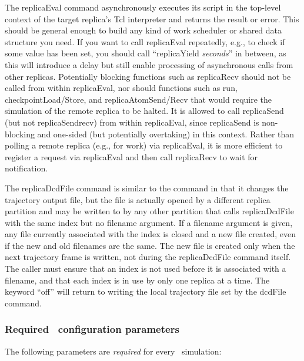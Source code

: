 The replicaEval command asynchronously executes its script in the top-level context
of the target replica's Tcl interpreter and returns the result or error.
This should be general enough to build any kind of work scheduler or shared data structure you need.
If you want to call replicaEval repeatedly, e.g., to check if some value has been set,
you should call ``replicaYield {\em seconds}'' in between, as this will introduce a delay but
still enable processing of asynchronous calls from other replicas.
Potentially blocking functions such as replicaRecv should not be called from within replicaEval,
nor should functions such as run, checkpointLoad/Store, and replicaAtomSend/Recv that would
require the simulation of the remote replica to be halted.
It is allowed to call replicaSend (but not replicaSendrecv) from within replicaEval, since
replicaSend is non-blocking and one-sided (but potentially overtaking) in this context.
Rather than polling a remote replica (e.g., for work) via replicaEval, it is more efficient
to register a request via replicaEval and then call replicaRecv to wait for notification.

The replicaDcdFile command is similar to the  command in that it changes the
trajectory output file, but the file is actually opened by a different replica partition
and may be written to by any other partition that calls replicaDcdFile with the same index
but no filename argument.  If a filename argument is given, any file currently associated
with the index is closed and a new file created, even if the new and old filenames are the same.
The new file is created only when the next trajectory frame is written,
not during the replicaDcdFile command itself.
The caller must ensure that an index is not used before it is associated with a filename,
and that each index is in use by only one replica at a time.
The keyword ``off'' will return to writing the local trajectory file set by the dcdFile command.

\subsubsection{Required \NAMD\ configuration parameters}
\label{section:requiredparams}

The following parameters are {\em required} for every
\NAMD\ simulation:

